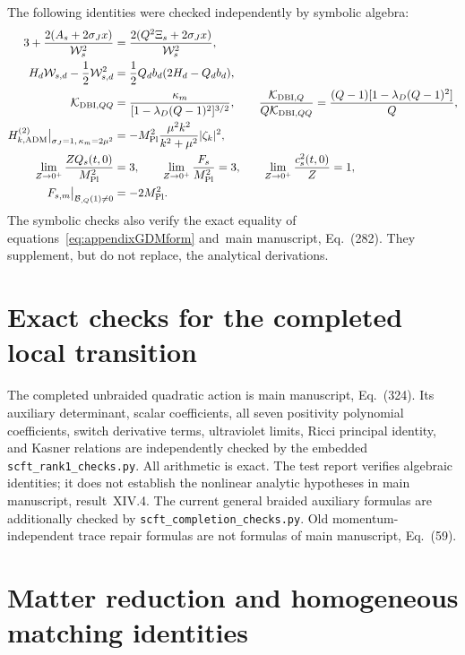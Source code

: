 \documentclass[aps,prd,reprint,onecolumn,notitlepage,nofootinbib,longbibliography,floatfix]{revtex4-2}
\theoremstyle{scstyle}
\theoremstyle{definition}
\theoremstyle{remark}
\newcommand{\mpl}{M_{\rm Pl}}
\newcommand{\cK}{\mathcal K}
\newcommand{\cB}{\mathcal B}
\begin{document}
The following identities were checked independently by symbolic algebra:
\begin{align}
3+\frac{2(A_s+2\sigma_Jx)}{\mathcal W_s^2}
&=\frac{2(Q^2\Xi_s+2\sigma_Jx)}{\mathcal W_s^2},
\label{eq:symboliccheck1}\\
H_d\mathcal W_{s,d}-\frac12\mathcal W_{s,d}^2
&=\frac12Q_db_d(2H_d-Q_db_d),
\label{eq:symboliccheck2}\\
\cK_{{\rm DBI},QQ}
&=\frac{\kappa_m}{[1-\lambda_D(Q-1)^2]^{3/2}},
\qquad
\frac{\cK_{{\rm DBI},Q}}{Q\cK_{{\rm DBI},QQ}}
=\frac{(Q-1)[1-\lambda_D(Q-1)^2]}{Q},
\label{eq:symboliccheck3}\\
H_{k,\rm ADM}^{(2)}\big|_{\sigma_J=1,\,\kappa_m=2\mu^2}
&=-\mpl^2\frac{\mu^2k^2}{k^2+\mu^2}|\zeta_k|^2,
\label{eq:symboliccheck4}\\
\lim_{Z\to0^+}\frac{ZQ_s(t,0)}{\mpl^2}
&=3,
\qquad
\lim_{Z\to0^+}\frac{F_s}{\mpl^2}=3,
\qquad
\lim_{Z\to0^+}\frac{c_s^2(t,0)}{Z}=1,
\label{eq:symboliccheck5}\\
F_{s,m}\big|_{\cB_{,Q}(1)\ne0}
&=-2\mpl^2.
\label{eq:symboliccheck6}
\end{align}
The symbolic checks also verify the exact equality of equations~\eqref{eq:appendixGDMform} and~main manuscript, Eq.~(282). They supplement, but do not replace, the analytical derivations.


\section{Exact checks for the completed local transition}
\label{app:minkowskiRepairChecks}
The completed unbraided quadratic action is main manuscript, Eq.~(324).
Its auxiliary determinant, scalar coefficients, all seven positivity
polynomial coefficients, switch derivative terms, ultraviolet limits,
Ricci principal identity, and Kasner relations are independently checked
by the embedded \texttt{scft\_rank1\_checks.py}. All arithmetic is exact.
The test report verifies algebraic identities; it does not establish the
nonlinear analytic hypotheses in main manuscript, result~XIV.4.
The current general braided auxiliary formulas are additionally checked
by \texttt{scft\_completion\_checks.py}. Old momentum-independent trace
repair formulas are not formulas of main manuscript, Eq.~(59).


\section{Matter reduction and homogeneous matching identities}
\label{app:mattermix}
\end{document}
